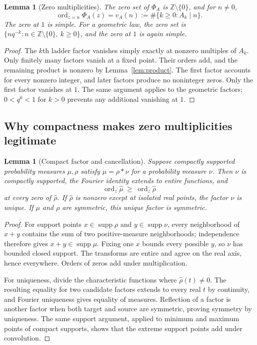 \documentclass[11pt,a4paper]{article}
\newtheorem{lemma}[theorem]{Lemma}
\theoremstyle{definition}
\theoremstyle{remark}
\newcommand{\Z}{\mathbb Z}
\newcommand{\supp}{\operatorname{supp}}
\newcommand{\ord}{\operatorname{ord}}
\begin{document}
\begin{lemma}[Zero multiplicities]\label{lem:zeros}
The zero set of $\Phi_A$ is $\Z\setminus\{0\}$, and for $n\ne0$,
\begin{equation}\label{eq:zero-orders}
 \ord_{z=n}\Phi_A(z)=v_A(n):=\#\{k\ge0:A_k\mid n\}.
\end{equation}
The zero at $1$ is simple. For a geometric law, the zero set is
$\{nq^{-k}:n\in\Z\setminus\{0\},\ k\ge0\}$, and the zero at $1$
is again simple.
\end{lemma}
\begin{proof}
The $k$th ladder factor vanishes simply exactly at nonzero multiples of
$A_k$. Only finitely many factors vanish at a fixed point. Their orders
add, and the remaining product is nonzero by Lemma~\ref{lem:product}.
The first factor accounts for every nonzero integer, and later factors
produce no noninteger zeros. Only the first factor vanishes at $1$.
The same argument applies to the geometric factors; $0<q^k<1$ for $k>0$
prevents any additional vanishing at $1$.
\end{proof}

\subsection{Why compactness makes zero multiplicities legitimate}
\begin{lemma}[Compact factor and cancellation]\label{lem:compact}
Suppose compactly supported probability measures $\mu,\rho$ satisfy
$\mu=\rho*\nu$ for a probability measure $\nu$. Then $\nu$ is compactly
supported, the Fourier identity extends to entire functions, and
\[
 \ord_z\widehat\mu\ \ge\ \ord_z\widehat\rho
\]
at every zero of $\widehat\rho$. If $\widehat\rho$ is nonzero except at
isolated real points, the factor $\nu$ is unique. If $\mu$ and $\rho$
are symmetric, this unique factor is symmetric.
\end{lemma}
\begin{proof}
For support points $x\in\supp\rho$ and $y\in\supp\nu$, every neighborhood
of $x+y$ contains the sum of two positive-measure neighborhoods; independence
therefore gives $x+y\in\supp\mu$. Fixing one $x$ bounds every possible
$y$, so $\nu$ has bounded closed support. The transforms are entire and
agree on the real axis, hence everywhere. Orders of zeros add under
multiplication.

For uniqueness, divide the characteristic functions where
$\widehat\rho(t)\ne0$. The resulting equality for two candidate factors
extends to every real $t$ by continuity, and Fourier uniqueness gives equality
of measures. Reflection of a factor is another factor when both target and
source are symmetric, proving symmetry by uniqueness. The same support
argument, applied to minimum and maximum points of compact supports, shows
that the extreme support points add under convolution.
\end{proof}
\end{document}
